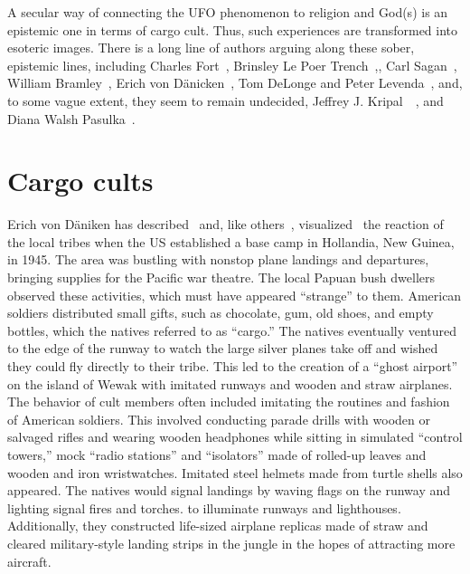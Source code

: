 A secular way of connecting the UFO phenomenon to religion and God(s) is an epistemic one in terms of cargo cult.
Thus, such experiences are transformed into esoteric images.
There is a long line of authors arguing along these sober, epistemic lines, including
Charles Fort~\cite{FortBotD},
Brinsley Le Poer Trench~\cite{lePoerTrench1961Jan},,
Carl Sagan~\cite[Section~5, pp.~495,496]{Sagan_1963},
William Bramley~\cite{Bramley1993Mar},
Erich von D\"anicken~\cite{vonDaeniken2019Jun,vonDaenikenCC},
Tom De{L}onge and Peter  Levenda~\cite{DeLongeLevenda-Gods,DeLongeLevenda-Men}, 
and, to some vague extent, they seem to remain undecided,
Jeffrey J. Kripal~\cite{Kripal2011Nov}~\cite{Kripal2011Nov,Kripal2021Jun}, and 
Diana Walsh Pasulka~\cite{Pasulka2019Feb}. 




\section{Cargo cults}
\label{2023-UFO-part-Speculation-cargo-cults-gen} %

Erich von D\"aniken has described~\cite{vonDaeniken2019Jun,vonDaenikenCC} and, like others~\cite{MondoCane1962},
visualized~\cite{vonDaeniken1970}
the reaction of the local tribes when the US established a base camp in Hollandia, New Guinea, in 1945.
The area was bustling with nonstop plane landings and departures, bringing supplies for the Pacific war theatre.
The local Papuan bush dwellers observed these activities, which must have appeared ``strange'' to them.
American soldiers distributed small gifts, such as chocolate, gum, old shoes, and empty bottles, which the natives referred to as ``cargo.''
The natives eventually ventured to the edge of the runway to watch the large silver planes take off and wished they could fly directly to their tribe.
This led to the creation of a ``ghost airport'' on the island of Wewak with imitated runways and wooden and straw airplanes.
The behavior of cult members often included imitating the routines and fashion of American soldiers.
This involved conducting parade drills with wooden or salvaged rifles and wearing wooden headphones while sitting in
simulated ``control towers,'' mock ``radio stations'' and ``isolators''
made of rolled-up leaves and wooden and iron wristwatches.
Imitated steel helmets made from turtle shells also appeared.
The natives would signal landings by waving flags on the runway and lighting signal fires and torches.
to illuminate runways and lighthouses.
Additionally, they constructed life-sized airplane replicas made of straw and cleared military-style landing strips
in the jungle in the hopes of attracting more aircraft.

